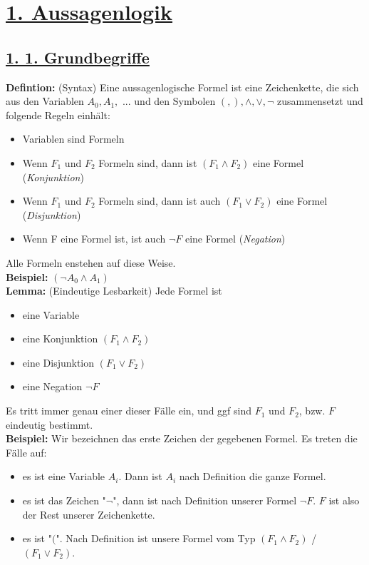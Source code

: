 \documentclass{scrartcl}
\begin{document}
\section*{\underline{1. Aussagenlogik}}

\subsection*{\underline{1. 1. Grundbegriffe}}
\textbf{Defintion:} (Syntax) Eine aussagenlogische Formel ist eine Zeichenkette, die sich aus den Variablen $A_0, A_1,$ ... und den Symbolen $(, ), \wedge, \vee, \neg$ zusammensetzt und folgende Regeln einh\"alt:
\begin{itemize}
\item Variablen sind Formeln 
\item Wenn $F_1$ und $F_2$ Formeln sind, dann ist $(F_1 \wedge F_2)$ eine Formel (\textit{Konjunktion})
\item Wenn $F_1$ und $F_2$ Formeln sind, dann ist auch $(F_1 \vee F_2)$ eine Formel (\textit{Disjunktion})
\item Wenn F eine Formel ist, ist auch $\neg F$ eine Formel (\textit{Negation})
\end{itemize}
Alle Formeln enstehen auf diese Weise.\\
\textbf{Beispiel:} $(\neg A_0 \wedge A_1)$\\
\textbf{Lemma:} (Eindeutige Lesbarkeit) Jede Formel ist
\begin{itemize}
\item eine Variable
\item eine Konjunktion $(F_1 \wedge F_2)$
\item eine Disjunktion $(F_1 \vee F_2)$
\item eine Negation $\neg F$
\end{itemize}
Es tritt immer genau einer dieser F\"alle ein, und ggf sind $F_1$ und $F_2$, bzw. $F$ eindeutig bestimmt.\\
\textbf{Beispiel:} Wir bezeichnen das erste Zeichen der gegebenen Formel. Es treten die F\"alle auf:
\begin{itemize}
\item es ist eine Variable $A_i$. Dann ist $A_i$ nach Definition die ganze Formel.
\item es ist das Zeichen "$\neg$", dann ist nach Definition unserer Formel $\neg F$. $F$ ist also der Rest unserer Zeichenkette.
\item es ist "$($". Nach Definition ist unsere Formel vom Typ $(F_1 \wedge F_2)$ / $(F_1 \vee F_2)$.
\end{itemize}
\end{document}
